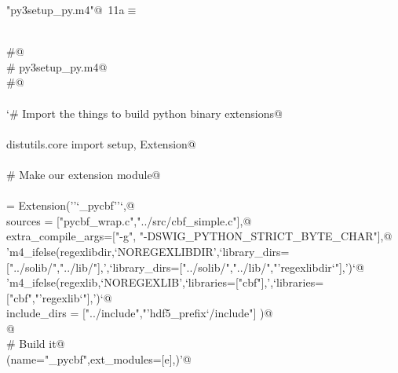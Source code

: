 \documentclass[10pt,a4paper,twoside,notitlepage]{article}
\begin{document}
\begin{flushleft} \small
\begin{minipage}{\linewidth}\label{scrap9}\raggedright\small
{} \verb@"py3setup_py.m4"@\nobreak\ {\footnotesize {11a}}$\equiv$
\vspace{-1ex}
\begin{list}{}{} \item
\mbox{}\verb@@\\
\mbox{}\verb@#@\\
\mbox{}\verb@#  py3setup_py.m4@\\
\mbox{}\verb@#@\\
\mbox{}\verb@@\\
\mbox{}\verb@`# Import the things to build python binary extensions@\\
\mbox{}\verb@@\\
\mbox{}\verb@from distutils.core import setup, Extension@\\
\mbox{}\verb@@\\
\mbox{}\verb@# Make our extension module@\\
\mbox{}\verb@@\\
\mbox{}\verb@e = Extension(''`_pycbf''`,@\\
\mbox{}\verb@              sources = ["pycbf_wrap.c","../src/cbf_simple.c"],@\\
\mbox{}\verb@         extra_compile_args=["-g", "-DSWIG_PYTHON_STRICT_BYTE_CHAR"],@\\
\mbox{}\verb@         'm4_ifelse(regexlibdir,`NOREGEXLIBDIR',`library_dirs=["../solib/","../lib/"],',`library_dirs=["../solib/","../lib/","'regexlibdir`"],')`@\\
\mbox{}\verb@         'm4_ifelse(regexlib,`NOREGEXLIB',`libraries=["cbf"],',`libraries=["cbf","'regexlib`"],')`@\\
\mbox{}\verb@         include_dirs = ["../include","'hdf5_prefix`/include"] )@\\
\mbox{}\verb@            @\\
\mbox{}\verb@# Build it@\\
\mbox{}\verb@setup(name="_pycbf",ext_modules=[e],)'@\\
\mbox{}\verb@@{\NWsep}
\end{list}
\vspace{-1.5ex}
\footnotesize
\begin{list}{}{\setlength{\itemsep}{-\parsep}\setlength{\itemindent}{-\leftmargin}}

\item{}
\end{list}
\end{minipage}\vspace{4ex}
\end{flushleft}
\end{document}
